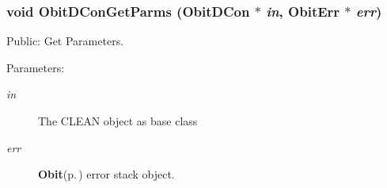\subsubsection{\setlength{\rightskip}{0pt plus 5cm}void Obit\-DCon\-Get\-Parms ({\bf Obit\-DCon} $\ast$ {\em in}, {\bf Obit\-Err} $\ast$ {\em err})}\label{ObitDCon_8h_a11}


Public: Get Parameters. 

\begin{Desc}
\item[Parameters:]
\begin{description}
\item[{\em in}]The CLEAN object as base class \item[{\em err}]{\bf Obit}{\rm (p.\,\pageref{structObit})} error stack object. \end{description}
\end{Desc}
